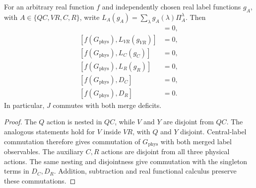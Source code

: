 \begin{theorem}
\label{thm:physical-label-merge-commutation}
\leanok
For an arbitrary real function $f$ and independently chosen real label
functions $g_A$, with $A\in\{QC,VR,C,R\}$, write
$L_A(g_A)=\sum_\lambda g_A(\lambda)\Pi_A^\lambda$. Then
\begin{align}
 [f(G_{\mathrm{phys}}),L_{QC}(g_{QC})]&=0,\\
 [f(G_{\mathrm{phys}}),L_{VR}(g_{VR})]&=0,\\
 [f(G_{\mathrm{phys}}),L_C(g_C)]&=0,\\
 [f(G_{\mathrm{phys}}),L_R(g_R)]&=0,\\
 [f(G_{\mathrm{phys}}),D_C]&=0,\\
 [f(G_{\mathrm{phys}}),D_R]&=0.
\end{align}
In particular, $J$ commutes with both merge deficits.
\end{theorem}

\begin{proof}
\leanok
The $Q$ action is nested in $QC$, while $V$ and $Y$ are disjoint from $QC$.
The analogous statements hold for $V$ inside $VR$, with $Q$ and $Y$
disjoint. Central-label commutation therefore gives commutation of
$G_{\mathrm{phys}}$ with both merged label observables. The auxiliary $C,R$ actions are disjoint from all three physical
actions. The same nesting and disjointness give commutation with the singleton terms in
$D_C,D_R$. Addition, subtraction and real functional calculus preserve
these commutations.
\end{proof}

